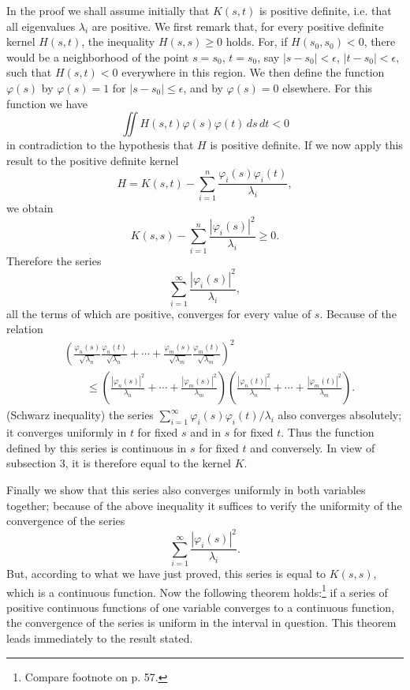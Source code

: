 In the proof we shall assume initially that $K(s,t)$ is positive definite, i.e. that all eigenvalues $\lambda_i$ are positive. We first remark that, for every positive definite kernel $H(s,t)$, the inequality $H(s,s)\ge0$ holds. For, if $H(s_0,s_0)<0$, there would be a neighborhood of the point $s=s_0$, $t=s_0$, say $|s-s_0|<\epsilon$, $|t-s_0|<\epsilon$, such that $H(s,t)<0$ everywhere in this region. We then define the function $\varphi(s)$ by $\varphi(s)=1$ for $|s-s_0|\le\epsilon$, and by $\varphi(s)=0$ elsewhere. For this function we have
\[
\iint H(s,t)\varphi(s)\varphi(t)\,ds\,dt<0
\]
in contradiction to the hypothesis that $H$ is positive definite. If we now apply this result to the positive definite kernel
\[
H=K(s,t)-\sum_{i=1}^{n}\frac{\varphi_i(s)\varphi_i(t)}{\lambda_i},
\]
we obtain
\[
K(s,s)-\sum_{i=1}^{n}\frac{|\varphi_i(s)|^2}{\lambda_i}\ge0.
\]
Therefore the series
\[
\sum_{i=1}^{\infty}\frac{|\varphi_i(s)|^2}{\lambda_i},
\]
all the terms of which are positive, converges for every value of $s$. Because of the relation
\[
\begin{aligned}
&\left(
\frac{\varphi_n(s)}{\sqrt{\lambda_n}}\frac{\varphi_n(t)}{\sqrt{\lambda_n}}
+\cdots+
\frac{\varphi_m(s)}{\sqrt{\lambda_m}}\frac{\varphi_m(t)}{\sqrt{\lambda_m}}
\right)^2\\
&\qquad\le
\left(\frac{|\varphi_n(s)|^2}{\lambda_n}+\cdots+\frac{|\varphi_m(s)|^2}{\lambda_m}\right)
\left(\frac{|\varphi_n(t)|^2}{\lambda_n}+\cdots+\frac{|\varphi_m(t)|^2}{\lambda_m}\right).
\end{aligned}
\]
(Schwarz inequality) the series $\sum_{i=1}^{\infty}\varphi_i(s)\varphi_i(t)/\lambda_i$ also converges absolutely; it converges uniformly in $t$ for fixed $s$ and in $s$ for fixed $t$. Thus the function defined by this series is continuous in $s$ for fixed $t$ and conversely. In view of subsection 3, it is therefore equal to the kernel $K$.

Finally we show that this series also converges uniformly in both variables together; because of the above inequality it suffices to verify the uniformity of the convergence of the series
\[
\sum_{i=1}^{\infty}\frac{|\varphi_i(s)|^2}{\lambda_i}.
\]
But, according to what we have just proved, this series is equal to $K(s,s)$, which is a continuous function. Now the following theorem holds:\footnote{Compare footnote on p. 57.} if a series of positive continuous functions of one variable converges to a continuous function, the convergence of the series is uniform in the interval in question. This theorem leads immediately to the result stated.

